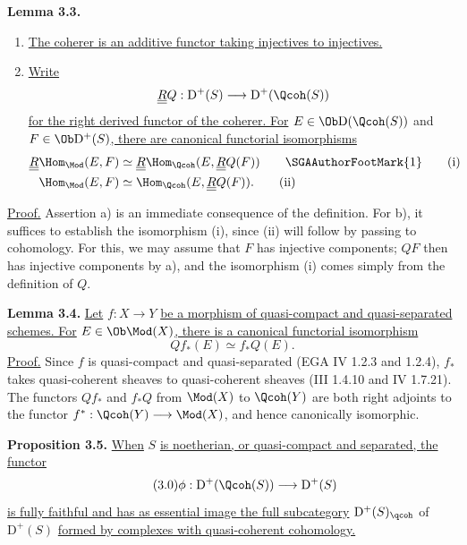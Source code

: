 \textbf{Lemma 3.3.} \begin{enumerate}[label=\alph*)]
\item \uline{The coherer is an additive functor taking injectives to injectives.}
\item \uline{Write}
\[
 \underline{\underline{R}}Q:\mathrm D^+(S)\longrightarrow \mathrm D^+(\Qcoh(S))
\]
\uline{for the right derived functor of the coherer. For} $E\in\Ob\mathrm D(\Qcoh(S))$ and $F\in\Ob\mathrm D^+(S)$\uline{, there are canonical functorial isomorphisms}
\begin{align}
 \underline{\underline{R}}\Hom_{\Mod}(E,F)&\simeq \underline{\underline{R}}\Hom_{\Qcoh}(E,\underline{\underline{R}}Q(F)) \qquad\text{\SGAAuthorFootMark{1}}\tag{i}\\
 \Hom_{\Mod}(E,F)&\simeq \Hom_{\Qcoh}(E,\underline{\underline{R}}Q(F)). \tag{ii}
\end{align}
\end{enumerate}

\uline{Proof.} Assertion a) is an immediate consequence of the definition. For b), it suffices to establish the isomorphism (i), since (ii) will follow by passing to cohomology. For this, we may assume that $F$ has injective components; $QF$ then has injective components by a), and the isomorphism (i) comes simply from the definition of $Q$.

\textbf{Lemma 3.4.} \uline{Let} $f:X\longrightarrow Y$ \uline{be a morphism of quasi-compact and quasi-separated schemes. For} $E\in\Ob\Mod(X)$\uline{, there is a canonical functorial isomorphism}
\[
 Qf_*(E)\simeq f_*Q(E).
\]
%
\uline{Proof.} Since $f$ is quasi-compact and quasi-separated (EGA IV 1.2.3 and 1.2.4), $f_*$ takes quasi-coherent sheaves to quasi-coherent sheaves (III 1.4.10 and IV 1.7.21). The functors $Qf_*$ and $f_*Q$ from $\Mod(X)$ to $\Qcoh(Y)$ are both right adjoints to the functor $f^*:\Qcoh(Y)\longrightarrow\Mod(X)$, and hence canonically isomorphic.

\textbf{Proposition 3.5.} \uline{When} $S$ \uline{is noetherian, or quasi-compact and separated, the functor}
\begin{equation}\tag{3.0}
 \phi:\mathrm D^+(\Qcoh(S))\longrightarrow \mathrm D^+(S)
\end{equation}
\uline{is fully faithful and has as essential image the full subcategory} $\mathrm D^+(S)_{\qcoh}$ of $\mathrm D^+(S)$ \uline{formed by complexes with quasi-coherent cohomology.}

